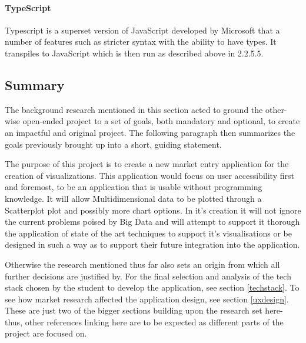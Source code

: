 \paragraph{TypeScript}
Typescript is a superset version of JavaScript developed by Microsoft that a number of features such as stricter syntax with the ability to have types. It transpiles to JavaScript which is then run as described above in 2.2.5.5.

\subsection{Summary}

The background research mentioned in this section acted to ground the other-wise open-ended project to a set of goals, both mandatory and optional, to create an impactful and original project. The following paragraph then summarizes the goals previously brought up into a short, guiding statement.

\begin{displayquote}
    The purpose of this project is to create a new market entry application for the creation of visualizations. This application would focus on user accessibility first and foremost, to be an application that is usable without programming knowledge. It will allow Multidimensional data to be plotted through a Scatterplot plot and possibly more chart options. In it's creation it will not ignore the current problems poised by Big Data and will attempt to support it thorough the application of state of the art techniques to support it's visualisations or be designed in such a way as to support their future integration into the application.
\end{displayquote}


Otherwise the research mentioned thus far also sets an origin from which all further decisions are justified by. For the final selection and analysis of the tech stack chosen by the student to develop the application, see section \ref{techstack}. To see how market research affected the application design, see section \ref{uxdesign}. These are just two of the bigger sections building upon the research set here- thus, other references linking here are to be expected as different parts of the project are focused on.


